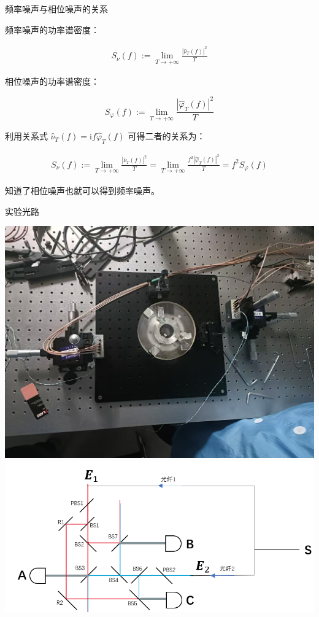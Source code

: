 \documentclass{beamer}
\begin{document}
\begin{frame}{频率噪声与相位噪声的关系}

    频率噪声的功率谱密度：

    $$
    \begin{aligned}
    S_\nu(f)
    :=\lim_{T\to +\infty} \frac{|\hat{\nu}_T(f)|^2}{T}
    \end{aligned}
    $$

    相位噪声的功率谱密度：

    $$
    S_\varphi(f)
    :=\lim_{T\to +\infty} \frac{|\hat{\varphi}_T(f) |^2}{T}
    $$

    利用关系式 $\hat{\nu}_{T}(f)=\mathrm{i}f\hat{\varphi}_T(f) $ 可得二者的关系为：

    $$
    \begin{aligned}
    S_\nu(f)
    :=\lim_{T\to +\infty} \frac{|\hat{\nu}_T(f)|^2}{T}
    =\lim_{T\to +\infty} \frac{f^2 |\hat{\varphi}_T(f)|^2}{T}
    =f^2 S_\varphi(f)
    \end{aligned}
    $$

    知道了相位噪声也就可以得到频率噪声。
    
\end{frame}

\begin{frame}{实验光路}
    \begin{minipage}[t]{\textwidth}
        \includegraphics[width=\linewidth, height=0.45\textheight, keepaspectratio]{image/1.jpg}
        \vspace{0.5em} %
        \includegraphics[width=\linewidth, height=0.45\textheight, keepaspectratio]{image/2.png}
    \end{minipage}
\end{frame}
\end{document}
